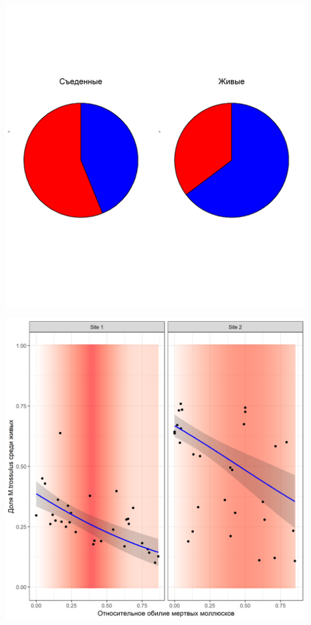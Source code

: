 \documentclass[a0,portrait]{a0poster}
\begin{document}
\begin{multicols}{2}
%
\begin{minipage}[t]{0.46\linewidth}		
	\begin{center}\vspace{0.1cm}
			\includegraphics[width=0.9\linewidth]{Pay_charts_aster.png}
			\label{Fig_pay_chart_aster}
		\end{center}
\end{minipage}\hspace{1cm}
%
\begin{minipage}[t]{0.46\linewidth}		
	\begin{center}\vspace{0.1cm}
			\includegraphics[width=0.9\linewidth]{Prop_dead_Prop_T.png}

\end{center}
\end{minipage}
\end{multicols}
\end{document}
